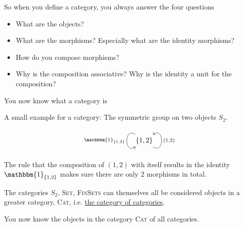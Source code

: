 \documentclass[12pt,compress]{beamer}
\begin{document}
\begin{frame}
So when you define a category, you always answer the four questions
\begin{itemize}[<.->]
\item What are the objects?
\item What are the morphisms? Especially what are the identity morphisms?
\item How do you compose morphisms?
\item Why is the composition associative? Why is the identity a unit for the composition?
\end{itemize}
\end{frame}
\begin{frame}
\begin{centering}
You now know what a category is
\end{centering}
\end{frame}
\begin{frame}
A small example for a category: The symmetric group on two objects $S_{2}$.
\[
\begin{tikzcd}
{\{1,2\}} \arrow["{\mathbbm{1}_{\{1,2\}}}"', loop, distance=2em, in=215, out=145] \arrow["{(1,2)}"', loop, distance=2em, in=35, out=325]
\end{tikzcd}
\]
The rule that the composition of $(1,2)$ with itself results in the identity $\mathbbm{1}_{\{1,2\}}$ makes sure there are only 2 morphisms in total.\\

\end{frame}

\begin{frame}[fragile]
The categories $S_{2}$, \textsc{Set}, \textsc{FinSets} can themselves all be considered objects in a greater category, \textsc{Cat}, i.e. \ul{the category of categories}.
\end{frame}
\begin{frame}
\begin{centering}
You now know the objects in the category \textsc{Cat} of all categories.
\end{centering}
\end{frame}
\end{document}
